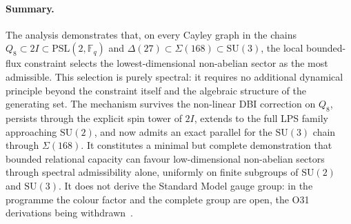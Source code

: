 \documentclass[11pt,a4paper]{article}
\begin{document}
  \paragraph{Summary.}
    The analysis demonstrates that, on every Cayley graph in the chains
    $Q_8 \subset 2I \subset \mathrm{PSL}(2,\mathbb{F}_q)$ and
    $\Delta(27) \subset \Sigma(168) \subset \mathrm{SU}(3)$,
    the local bounded-flux constraint selects the lowest-dimensional non-abelian sector
    as the most admissible.
    This selection is purely spectral: it requires no additional dynamical
    principle beyond the constraint itself and the algebraic structure of the
    generating set.
    The mechanism survives the non-linear DBI correction on $Q_8$, persists
    through the explicit spin tower of $2I$, extends to the full LPS family
    approaching $\mathrm{SU}(2)$, and now admits an exact parallel for the
    $\mathrm{SU}(3)$ chain through $\Sigma(168)$.
    It constitutes a minimal but complete demonstration that bounded
    relational capacity can favour low-dimensional non-abelian sectors through
    spectral admissibility alone, uniformly on finite subgroups of $\mathrm{SU}(2)$ and
    $\mathrm{SU}(3)$.
    It does not derive the Standard Model gauge group: in the programme the colour factor
    and the complete group are open, the O31 derivations being withdrawn~\cite{Beau2026a35}.

  
  
\end{document}

